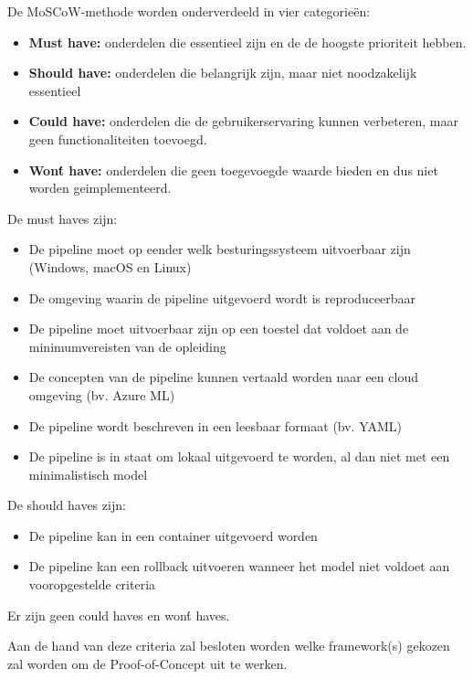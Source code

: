De MoSCoW-methode worden onderverdeeld in vier categorieën:
\begin{itemize}
    \item \textbf{Must have:} onderdelen die essentieel zijn en de de hoogste prioriteit hebben.
    \item \textbf{Should have:} onderdelen die belangrijk zijn, maar niet noodzakelijk essentieel
    \item \textbf{Could have:} onderdelen die de gebruikerservaring kunnen verbeteren, maar geen functionaliteiten toevoegd.
    \item \textbf{ Won\'t have:} onderdelen die geen toegevoegde waarde bieden en dus niet worden geimplementeerd.
\end{itemize}
De must haves zijn:
\begin{itemize}
    \item De pipeline moet op eender welk besturingssysteem uitvoerbaar zijn (Windows, macOS en Linux)
    \item De omgeving waarin de pipeline uitgevoerd wordt is reproduceerbaar
    \item De pipeline moet uitvoerbaar zijn op een toestel dat voldoet aan de minimumvereisten van de opleiding
    \item De concepten van de pipeline kunnen vertaald worden naar een cloud omgeving (bv. Azure ML)
    \item De pipeline wordt beschreven in een leesbaar formaat (bv. YAML)
    \item De pipeline is in staat om lokaal uitgevoerd te worden, al dan niet met een minimalistisch model
\end{itemize}
De should haves zijn:
\begin{itemize}
    \item De pipeline kan in een container uitgevoerd worden
    \item De pipeline kan een rollback uitvoeren wanneer het model niet voldoet aan vooropgestelde criteria
\end{itemize}
Er zijn geen could haves en won\'t haves.

Aan de hand van deze criteria zal besloten worden welke framework(s) gekozen zal worden om de Proof-of-Concept uit te werken.

